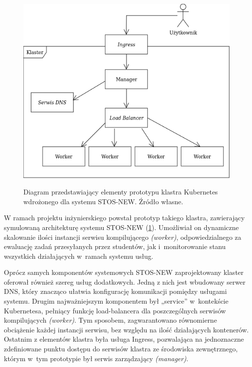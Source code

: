 \begin{figure}[!h]
	\begin{center}
		\resizebox{0.7\textwidth}{!} {
			\includegraphics{img/4/k8s.png}
		}
		\caption[Diagram prototypu klastra Kubernetes]{Diagram przedstawiający elementy prototypu klastra Kubernetes wdrożonego dla systemu STOS-NEW. Źródło własne.}
		\label{diagramk8s}
	\end{center}
\end{figure}

W ramach projektu inżynierskiego powstał prototyp takiego klastra, zawierający symulowaną architekturę systemu STOS-NEW (\ref{diagramk8s}). Umożliwiał on dynamiczne skalowanie ilości instancji serwisu kompilującego \textit{(worker)}, odpowiedzialnego za ewaluację zadań przesyłanych przez studentów, jak i~monitorowanie stanu wszystkich działających w~ramach systemu usług.

Oprócz samych komponentów systemowych STOS-NEW zaprojektowany klaster oferował również szereg usług dodatkowych. Jedną z nich jest wbudowany serwer DNS, który znacząco ułatwia konfigurację komunikacji pomiędzy usługami systemu\cite{k8sDns}. Drugim najważniejszym komponentem był „service” w~kontekście Kubernetesa, pełniący funkcję load-balancera dla poszczególnych serwisów kompilujących \textit{(worker)}. Tym sposobem, zagwarantowano równomierne obciążenie każdej instancji serwisu, bez względu na ilość działających kontenerów\cite{k8sService}. Ostatnim z elementów klastra była usługa Ingress, pozwalająca na jednoznaczne zdefiniowane punktu dostępu do serwisów klastra ze środowiska zewnętrznego, którym w~tym prototypie był serwis zarządzający \textit{(manager)}\cite{k8sIngress}.

